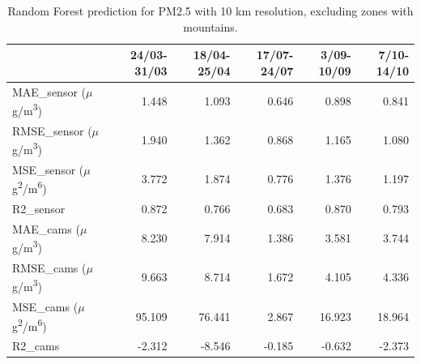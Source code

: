 \begin{table}[H]
\begin{tabular}{lrrrrr}
\toprule
 &  24/03-31/03 &  18/04-25/04 &  17/07-24/07 &  3/09-10/09 &  7/10-14/10 \\
\midrule
 MAE\_sensor ($\mu$g/m\textsuperscript{3})&        1.448 &        1.093 &        0.646 &       0.898 &       0.841 \\
RMSE\_sensor ($\mu$g/m\textsuperscript{3})&        1.940 &        1.362 &        0.868 &       1.165 &       1.080 \\
 MSE\_sensor ($\mu$g\textsuperscript{2}/m\textsuperscript{6})&        3.772 &        1.874 &        0.776 &       1.376 &       1.197 \\
  R2\_sensor &        0.872 &        0.766 &        0.683 &       0.870 &       0.793 \\
   MAE\_cams ($\mu$g/m\textsuperscript{3})&        8.230 &        7.914 &        1.386 &       3.581 &       3.744 \\
  RMSE\_cams ($\mu$g/m\textsuperscript{3})&        9.663 &        8.714 &        1.672 &       4.105 &       4.336 \\
   MSE\_cams ($\mu$g\textsuperscript{2}/m\textsuperscript{6})&       95.109 &       76.441 &        2.867 &      16.923 &      18.964 \\
    R2\_cams &       -2.312 &       -8.546 &       -0.185 &      -0.632 &      -2.373 \\
\bottomrule
\bottomrule
\end{tabular}
\caption{Random Forest prediction for PM2.5 with 10 km resolution, excluding zones with mountains.}
\end{table}

